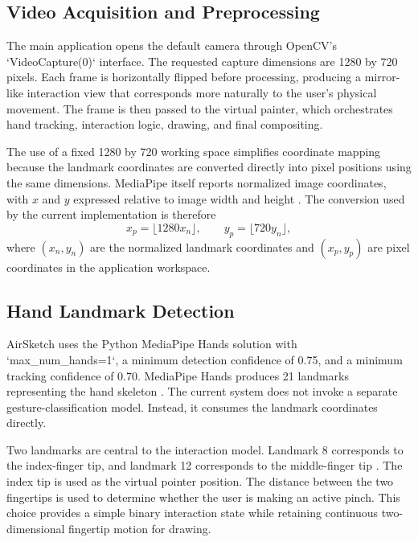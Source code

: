 \documentclass[conference]{IEEEtran}
\begin{document}
\subsection{Video Acquisition and Preprocessing}
The main application opens the default camera through OpenCV's `VideoCapture(0)` interface. The requested capture dimensions are 1280 by 720 pixels. Each frame is horizontally flipped before processing, producing a mirror-like interaction view that corresponds more naturally to the user's physical movement. The frame is then passed to the virtual painter, which orchestrates hand tracking, interaction logic, drawing, and final compositing.

The use of a fixed 1280 by 720 working space simplifies coordinate mapping because the landmark coordinates are converted directly into pixel positions using the same dimensions. MediaPipe itself reports normalized image coordinates, with $x$ and $y$ expressed relative to image width and height \cite{mediapipe_docs}. The conversion used by the current implementation is therefore
\begin{equation}
 x_p = \lfloor 1280x_n \rfloor, \qquad y_p = \lfloor 720y_n \rfloor,
\end{equation}
where $(x_n,y_n)$ are the normalized landmark coordinates and $(x_p,y_p)$ are pixel coordinates in the application workspace.

\subsection{Hand Landmark Detection}
AirSketch uses the Python MediaPipe Hands solution with `max\_num\_hands=1`, a minimum detection confidence of 0.75, and a minimum tracking confidence of 0.70. MediaPipe Hands produces 21 landmarks representing the hand skeleton \cite{vasavi}. The current system does not invoke a separate gesture-classification model. Instead, it consumes the landmark coordinates directly.

Two landmarks are central to the interaction model. Landmark 8 corresponds to the index-finger tip, and landmark 12 corresponds to the middle-finger tip \cite{vasavi}. The index tip is used as the virtual pointer position. The distance between the two fingertips is used to determine whether the user is making an active pinch. This choice provides a simple binary interaction state while retaining continuous two-dimensional fingertip motion for drawing.
\end{document}

